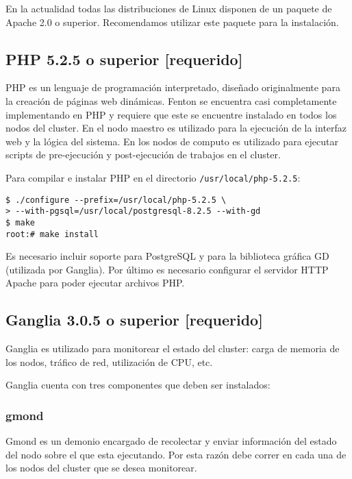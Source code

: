 \documentclass[a4paper,10pt,spanish]{article}
\begin{document}
En la actualidad todas las distribuciones de Linux disponen de un paquete de Apache 2.0 o superior. Recomendamos utilizar este paquete para la instalaci\'{o}n.

\subsection{PHP 5.2.5 o superior \small{[requerido]}}

PHP\cite{php} es un lenguaje de programaci\'{o}n interpretado, dise\~{n}ado originalmente para la creaci\'{o}n de p\'{a}ginas web din\'{a}micas. Fenton se encuentra casi completamente implementando en PHP y requiere que este se encuentre instalado en todos los nodos del cluster. En el nodo maestro es utilizado para la ejecuci\'{o}n de la interfaz web y la l\'{o}gica del sistema. En los nodos de computo es utilizado para ejecutar scripts de pre-ejecuci\'{o}n y post-ejecuci\'{o}n de trabajos en el cluster.

Para compilar e instalar PHP en el directorio \mbox{\texttt{/usr/local/php-5.2.5}}:

\begin{verbatim}
$ ./configure --prefix=/usr/local/php-5.2.5 \
> --with-pgsql=/usr/local/postgresql-8.2.5 --with-gd 
$ make 
root:# make install
\end{verbatim}

Es necesario incluir soporte para PostgreSQL y para la biblioteca gr\'{a}fica GD (utilizada por Ganglia). Por \'{u}ltimo es necesario configurar el servidor HTTP Apache para poder ejecutar archivos PHP.

\subsection{Ganglia 3.0.5 o superior \small{[requerido]}}

Ganglia es utilizado para monitorear el estado del cluster: carga de memoria de los nodos, tr\'{a}fico de red, utilizaci\'{o}n de CPU, etc. 

Ganglia cuenta con tres componentes que deben ser instalados:

\subsubsection{gmond}

Gmond es un demonio encargado de recolectar y enviar informaci\'{o}n del estado del nodo sobre el que esta ejecutando. Por esta raz\'{o}n debe correr en cada una de los nodos del cluster que se desea monitorear.
\end{document}
